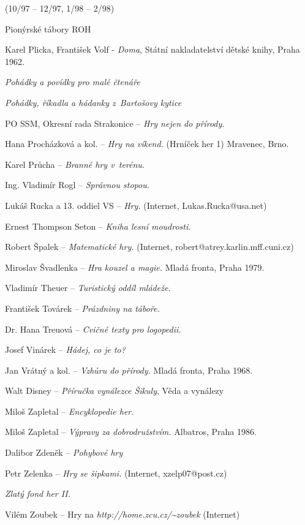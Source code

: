 \begin{multicols}{2}
\begin{list}{[]}{}
  (10/97 -- 12/97, 1/98 -- 2/98)
\item Pionýrské tábory ROH
\item Karel Plicka, František Volf - {\it Doma},
  Státní nakladatelství dětské knihy, Praha 1962.
\item {\it Pohádky a povídky pro malé čtenáře}
\item {\it Pohádky, říkadla a hádanky z~Bartošovy kytice}
\item PO SSM, Okresní rada Strakonice -- {\it Hry nejen do přírody.}
\item Hana Procházková a kol. -- {\it Hry na víkend.} (Hrníček her 1)
  Mravenec, Brno.
\item Karel Průcha -- {\it Branné hry v~terénu.}
\item Ing. Vladimír Rogl -- {\it Správnou stopou.}
\item Lukáš Rucka a 13. oddiel VS -- {\it Hry.}
  (Internet, Lukas.Rucka@usa.net)
\item Ernest Thompson Seton -- {\it Kniha lesní moudrosti.}
\item Robert Špalek -- {\it Matematické hry.}
  (Internet, robert@atrey.karlin.mff.cuni.cz)
\item Miroslav Švadlenka -- {\it Hra kouzel a magie.}
  Mladá fronta, Praha 1979.
\item Vladimír Theuer -- {\it Turistický oddíl mládeže.}
\item František Továrek -- {\it Prázdniny na táboře.}
\item Dr. Hana Treuová -- {\it Cvičné texty pro logopedii.}
\item Josef Vinárek -- {\it Hádej, co je to?}
\item Jan Vrátný a kol. -- {\it Vzhůru do přírody.}
  Mladá fronta, Praha 1968.
\item Walt Disney -- {\it Příručka vynálezce Šikuly}, Věda a vynálezy
\item Miloš Zapletal -- {\it Encyklopedie her.}
\item Miloš Zapletal -- {\it Výpravy za dobrodružstvím.}
  Albatros, Praha 1986.
\item Dalibor Zdeněk -- {\it Pohybové hry}
\item\label{zele1} Petr Zelenka -- {\it Hry se šipkami.}
  (Internet, xzelp07@post.cz)
\item {\it Zlatý fond her II.}
\item Vilém Zoubek -- Hry na {\it http://home.zcu.cz/{\textasciitilde}zoubek}
  (Internet)
  
\end{list}
\end{multicols}

\clearpage

